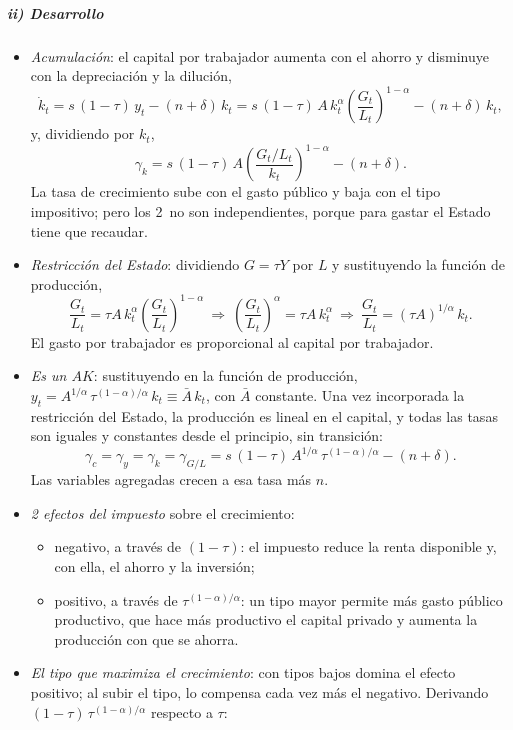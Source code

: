 \documentclass[11pt]{article}
\begin{document}
\subparagraph{ii) Desarrollo}

\begin{itemize}
\item \emph{Acumulación}: el capital por trabajador aumenta con el ahorro y disminuye con la depreciación y la dilución,
  \[\dot k_t=s\,(1-\tau)\,y_t-(n+\delta)\,k_t=s\,(1-\tau)\,A\,k_t^{\alpha}\left(\frac{G_t}{L_t}\right)^{1-\alpha}-(n+\delta)\,k_t,\]
  y, dividiendo por $k_t$,
  \[\gamma_k=s\,(1-\tau)\,A\left(\frac{G_t/L_t}{k_t}\right)^{1-\alpha}-(n+\delta).\]
  La tasa de crecimiento sube con el gasto público y baja con el tipo impositivo; pero los 2~no son independientes, porque para gastar el Estado tiene que recaudar.
\item \emph{Restricción del Estado}: dividiendo $G=\tau Y$ por $L$ y sustituyendo la función de producción,
  \[\frac{G_t}{L_t}=\tau A\,k_t^{\alpha}\left(\frac{G_t}{L_t}\right)^{1-\alpha}\ \Longrightarrow\ \left(\frac{G_t}{L_t}\right)^{\alpha}=\tau A\,k_t^{\alpha}\ \Longrightarrow\ \frac{G_t}{L_t}=(\tau A)^{1/\alpha}\,k_t.\]
  El gasto por trabajador es proporcional al capital por trabajador.
\item \emph{Es un $AK$}: sustituyendo en la función de producción, $y_t=A^{1/\alpha}\,\tau^{(1-\alpha)/\alpha}\,k_t\equiv\bar A\,k_t$, con $\bar A$ constante. Una vez incorporada la restricción del Estado, la producción es lineal en el capital, y todas las tasas son iguales y constantes desde el principio, sin transición:
  \begin{equation}
  \gamma_c=\gamma_y=\gamma_k=\gamma_{G/L}=s\,(1-\tau)\,A^{1/\alpha}\,\tau^{(1-\alpha)/\alpha}-(n+\delta).\label{eq:barro}
  \end{equation}
  Las variables agregadas crecen a esa tasa más $n$.
\item \emph{2 efectos del impuesto} sobre el crecimiento:
  \begin{itemize}
  \item \textcolor{tceerojo}{negativo}, a través de \textcolor{tceerojo}{$(1-\tau)$}: el impuesto reduce la renta disponible y, con ella, el ahorro y la inversión;
  \item \textcolor{tceeverde}{positivo}, a través de \textcolor{tceeverde}{$\tau^{(1-\alpha)/\alpha}$}: un tipo mayor permite más gasto público productivo, que hace más productivo el capital privado y aumenta la producción con que se ahorra.
  \end{itemize}
\item \emph{El tipo que maximiza el crecimiento}: con tipos bajos domina el efecto positivo; al subir el tipo, lo compensa cada vez más el negativo. Derivando $(1-\tau)\,\tau^{(1-\alpha)/\alpha}$ respecto a $\tau$:

\end{itemize}
\end{document}
